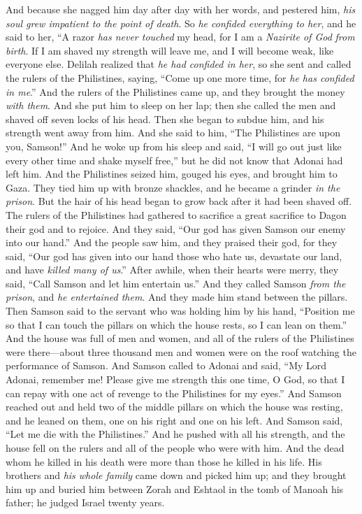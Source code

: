 \begin{biblechapter}
\verse And because she nagged him day after day with her words, and pestered him, \textit{his soul grew impatient to the point of death}.
\verse So \textit{he confided everything to her}, and he said to her, “A razor \textit{has never touched} my head, for I am a \textit{Nazirite of God} \textit{from birth}. If I am shaved my strength will leave me, and I will become weak, like everyone else.
\verse Delilah realized that \textit{he had confided in her}, so she sent and called the rulers of the Philistines, saying, “Come up one more time, for \textit{he has confided in me}.” And the rulers of the Philistines came up, and they brought the money \textit{with them}.
\verse And she put him to sleep on her lap; then she called the men and shaved off seven locks of his head. Then she began to subdue him, and his strength went away from him.
\verse And she said to him, “The Philistines are upon you, Samson!” And he woke up from his sleep and said, “I will go out just like every other time and shake myself free,” but he did not know that Adonai had left him.
\verse And the Philistines seized him, gouged his eyes, and brought him to Gaza. They tied him up with bronze shackles, and he became a grinder \textit{in the prison}.
\verse But the hair of his head began to grow back after it had been shaved off.
\verse The rulers of the Philistines had gathered to sacrifice a great sacrifice to Dagon their god and to rejoice. And they said, “Our god has given Samson our enemy into our hand.”
\verse And the people saw him, and they praised their god, for they said, “Our god has given into our hand those who hate us, devastate our land, and have \textit{killed many of us}.”
\verse After awhile, when their hearts were merry, they said, “Call Samson and let him entertain us.” And they called Samson \textit{from the prison}, and \textit{he entertained them}. And they made him stand between the pillars.
\verse Then Samson said to the servant who was holding him by his hand, “Position me so that I can touch the pillars on which the house rests, so I can lean on them.”
\verse And the house was full of men and women, and all of the rulers of the Philistines were there—about three thousand men and women were on the roof watching the performance of Samson.
 And Samson called to Adonai and said, “My Lord Adonai, remember me! Please give me strength this one time, O God, so that I can repay with one act of revenge to the Philistines for my eyes.”
\verse And Samson reached out and held two of the middle pillars on which the house was resting, and he leaned on them, one on his right and one on his left.
\verse And Samson said, “Let me die with the Philistines.” And he pushed with all his strength, and the house fell on the rulers and all of the people who were with him. And the dead whom he killed in his death were more than those he killed in his life.
\verse His brothers and \textit{his whole family} came down and picked him up; and they brought him up and buried him between Zorah and Eshtaol in the tomb of Manoah his father; he judged Israel twenty years.
\end{biblechapter}

